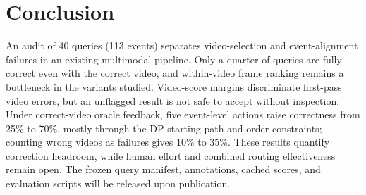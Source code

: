 \section{Conclusion}
\label{sec:conclusion}

An audit of 40 queries (113 events) separates video-selection and event-alignment failures in an existing multimodal pipeline.
Only a quarter of queries are fully correct even with the correct video, and within-video frame ranking remains a bottleneck in the variants studied.
Video-score margins discriminate first-pass video errors, but an unflagged result is not safe to accept without inspection.
Under correct-video oracle feedback, five event-level actions raise correctness from 25\% to 70\%, mostly through the DP starting path and order constraints; counting wrong videos as failures gives 10\% to 35\%.
These results quantify correction headroom, while human effort and combined routing effectiveness remain open.
The frozen query manifest, annotations, cached scores, and evaluation scripts will be released upon publication.
